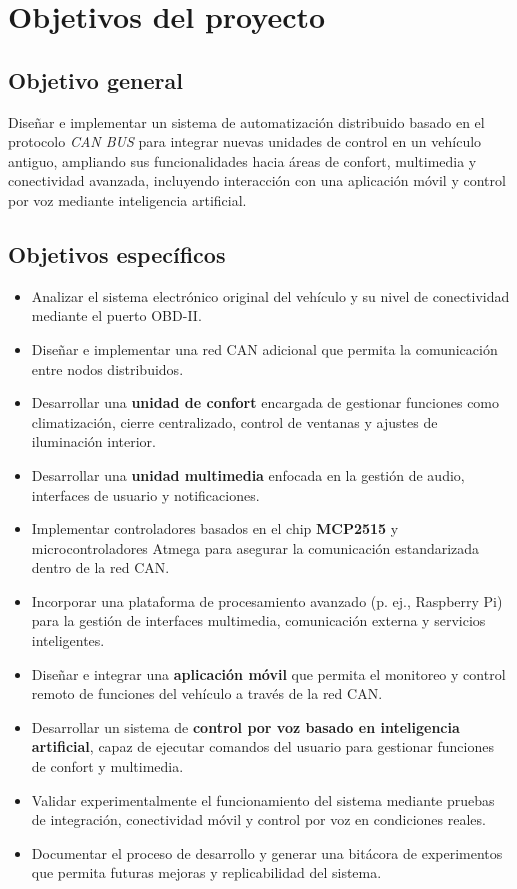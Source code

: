 \section{Objetivos del proyecto}

\subsection{Objetivo general}

Diseñar e implementar un sistema de automatización distribuido basado en el protocolo \textit{CAN BUS} para integrar nuevas unidades de control en un vehículo antiguo, ampliando sus funcionalidades hacia áreas de confort, multimedia y conectividad avanzada, incluyendo interacción con una aplicación móvil y control por voz mediante inteligencia artificial.

\subsection{Objetivos específicos}

\begin{itemize}
    \item Analizar el sistema electrónico original del vehículo y su nivel de conectividad mediante el puerto OBD-II.
    \item Diseñar e implementar una red CAN adicional que permita la comunicación entre nodos distribuidos.
    \item Desarrollar una \textbf{unidad de confort} encargada de gestionar funciones como climatización, cierre centralizado, control de ventanas y ajustes de iluminación interior.
    \item Desarrollar una \textbf{unidad multimedia} enfocada en la gestión de audio, interfaces de usuario y notificaciones.
    \item Implementar controladores basados en el chip \textbf{MCP2515} y microcontroladores Atmega para asegurar la comunicación estandarizada dentro de la red CAN.
    \item Incorporar una plataforma de procesamiento avanzado (p. ej., Raspberry Pi) para la gestión de interfaces multimedia, comunicación externa y servicios inteligentes.
    \item Diseñar e integrar una \textbf{aplicación móvil} que permita el monitoreo y control remoto de funciones del vehículo a través de la red CAN.
    \item Desarrollar un sistema de \textbf{control por voz basado en inteligencia artificial}, capaz de ejecutar comandos del usuario para gestionar funciones de confort y multimedia.
    \item Validar experimentalmente el funcionamiento del sistema mediante pruebas de integración, conectividad móvil y control por voz en condiciones reales.
    \item Documentar el proceso de desarrollo y generar una bitácora de experimentos que permita futuras mejoras y replicabilidad del sistema.
\end{itemize}
